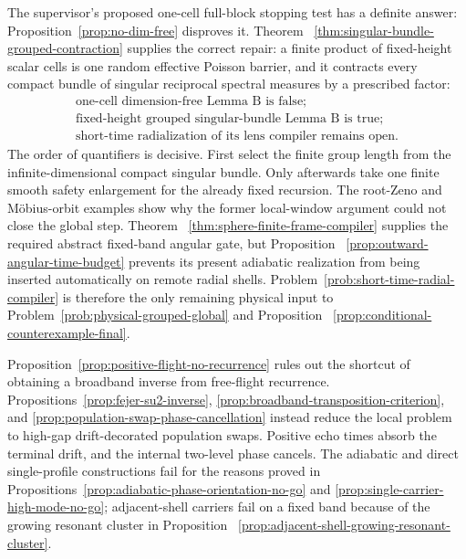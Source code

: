 \documentclass[11pt]{article}
\theoremstyle{remark}
\begin{document}
The supervisor's proposed one-cell full-block stopping test has a definite
answer: Proposition~\ref{prop:no-dim-free} disproves it.  Theorem
~\ref{thm:singular-bundle-grouped-contraction} supplies the correct repair:
a finite product of fixed-height scalar cells is one random effective Poisson
barrier, and it contracts every compact bundle of singular reciprocal spectral
measures by a prescribed factor:
\[
 \boxed{
 \begin{gathered}
 \text{one-cell dimension-free Lemma B is false;}\\
  \text{fixed-height grouped singular-bundle Lemma B is true;}\\
  \text{short-time radialization of its lens compiler remains open.}
 \end{gathered}}
\]
The order of quantifiers is decisive.  First select the finite group length
from the infinite-dimensional compact singular bundle.  Only afterwards take
one finite smooth safety enlargement for the already fixed recursion.  The
root-Zeno and M\"obius-orbit examples show why the former local-window
argument could not close the global step.  Theorem
~\ref{thm:sphere-finite-frame-compiler} supplies the required abstract
fixed-band angular gate, but Proposition
~\ref{prop:outward-angular-time-budget} prevents its present adiabatic
realization from being inserted automatically on remote radial shells.
Problem~\ref{prob:short-time-radial-compiler} is therefore the only remaining
physical input to Problem~\ref{prob:physical-grouped-global} and Proposition
~\ref{prop:conditional-counterexample-final}.

 Proposition~\ref{prop:positive-flight-no-recurrence} rules out the shortcut
 of obtaining a broadband inverse from free-flight recurrence.
 Propositions~\ref{prop:fejer-su2-inverse},
 \ref{prop:broadband-transposition-criterion}, and
 \ref{prop:population-swap-phase-cancellation} instead reduce the local
 problem to high-gap drift-decorated population swaps.  Positive echo times
 absorb the terminal drift, and the internal two-level phase cancels.
 The adiabatic and direct single-profile constructions fail for the reasons
 proved in Propositions~\ref{prop:adiabatic-phase-orientation-no-go} and
 \ref{prop:single-carrier-high-mode-no-go}; adjacent-shell carriers fail on a
 fixed band because of the growing resonant cluster in Proposition
 ~\ref{prop:adjacent-shell-growing-resonant-cluster}.
\end{document}
